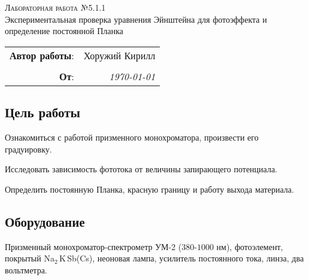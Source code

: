 
\phantom{42}
\vspace{20mm}

\begin{center}
    \LARGE \textsc{Лабораторная работа №5.1.1} \\
    \vspace{3 mm}
    \large Экспериментальная проверка уравнения Эйнштейна для фотоэффекта и определение постоянной Планка
\end{center}


\phantom{42}

\begin{flushright}
    \begin{tabular}{rr}
        \textbf{Автор работы}: 
        & Хоружий Кирилл \\
        & \\
        \textbf{От}: &
        \textit{\today}\\
    \end{tabular}
\end{flushright}

\thispagestyle{empty}

\vspace{10mm}


\subsection*{Цель работы}
\begin{enumerate*}
    \item Ознакомиться с работой призменного монохроматора, произвести его градуировку.
    \item Исследовать зависимость фототока от величины запирающего потенциала.
    \item Определить постоянную Планка, красную границу и работу выхода материала.
\end{enumerate*}


\subsection*{Оборудование}
Призменный монохроматор-спектрометр УМ-2 ($380$-$1000$ нм), 
фотоэлемент, покрытый Na$_2$\,K\,Sb(Cs), 
неоновая лампа,
усилитель постоянного тока,
линза, два вольтметра.




\newpage
